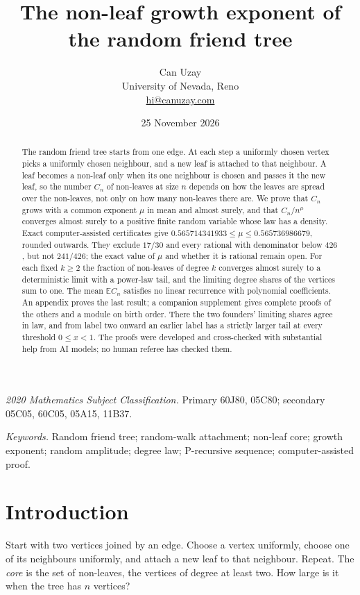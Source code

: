 \documentclass[11pt]{article}
\title{The non-leaf growth exponent of the random friend tree}
\author{Can Uzay\\\small University of Nevada, Reno\\\small\href{mailto:hi@canuzay.com}{hi@canuzay.com}}
\date{25 November 2026}
\theoremstyle{remark}
\newcommand{\E}{\mathbb E}
\begin{document}
\maketitle
\begin{abstract}
The random friend tree starts from one edge. At each step a uniformly chosen vertex picks a uniformly chosen neighbour, and a new leaf is attached to that neighbour. A leaf becomes a non-leaf only when its one neighbour is chosen and passes it the new leaf, so the number $C_n$ of non-leaves at size $n$ depends on how the leaves are spread over the non-leaves, not only on how many non-leaves there are. We prove that $C_n$ grows with a common exponent $\mu$ in mean and almost surely, and that $C_n/n^\mu$ converges almost surely to a positive finite random variable whose law has a density. Exact computer-assisted certificates give $0.565714341933\le\mu\le0.565736986679$, rounded outwards. They exclude $17/30$ and every rational with denominator below $426$, but not $241/426$; the exact value of $\mu$ and whether it is rational remain open. For each fixed $k\ge2$ the fraction of non-leaves of degree $k$ converges almost surely to a deterministic limit with a power-law tail, and the limiting degree shares of the vertices sum to one. The mean $\E C_n$ satisfies no linear recurrence with polynomial coefficients. An appendix proves the last result; a companion supplement gives complete proofs of the others and a module on birth order. There the two founders' limiting shares agree in law, and from label two onward an earlier label has a strictly larger tail at every threshold $0\le x<1$. The proofs were developed and cross-checked with substantial help from AI models; no human referee has checked them.
\end{abstract}

\noindent\textit{2020 Mathematics Subject Classification.} Primary 60J80, 05C80; secondary 05C05, 60C05, 05A15, 11B37.

\noindent\textit{Keywords.} Random friend tree; random-walk attachment; non-leaf core; growth exponent; random amplitude; degree law; P-recursive sequence; computer-assisted proof.

\section{Introduction}\label{sec:intro}
Start with two vertices joined by an edge. Choose a vertex uniformly, choose one of its neighbours uniformly, and attach a new leaf to that neighbour. Repeat. The \emph{core} is the set of non-leaves, the vertices of degree at least two. How large is it when the tree has $n$ vertices?
\end{document}
